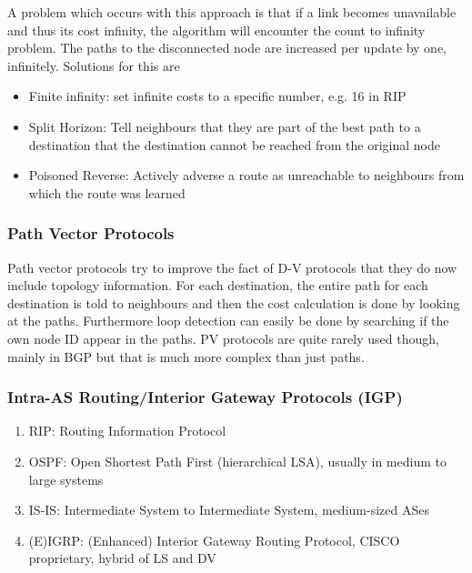 A problem which occurs with this approach is that if a link becomes unavailable and thus its cost infinity, the algorithm will encounter the count to infinity problem.
The paths to the disconnected node are increased per update by one, infinitely.
Solutions for this are
\begin{itemize}
  \item Finite infinity: set infinite costs to a specific number, e.g. 16 in RIP
  \item Split Horizon: Tell neighbours that they are part of the best path to a destination that the destination cannot be reached from the original node
  \item Poisoned Reverse: Actively adverse a route as unreachable to neighbours from which the route was learned
\end{itemize}

\subsubsection*{Path Vector Protocols}
Path vector protocols try to improve the fact of D-V protocols that they do now include topology information.
For each destination, the entire path for each destination is told to neighbours and then the cost calculation is done by looking at the paths.
Furthermore loop detection can easily be done by searching if the own node ID appear in the paths.
PV protocols are quite rarely used though, mainly in BGP but that is much more complex than just paths.

\subsubsection*{Intra-AS Routing/Interior Gateway Protocols (IGP)}
\begin{enumerate}
  \item RIP: Routing Information Protocol
  \item OSPF: Open Shortest Path First (hierarchical LSA), usually in medium to large systems
  \item IS-IS: Intermediate System to Intermediate System, medium-sized ASes
  \item (E)IGRP: (Enhanced) Interior Gateway Routing Protocol, CISCO proprietary, hybrid of LS and DV
\end{enumerate}
\vspace{5pt}

